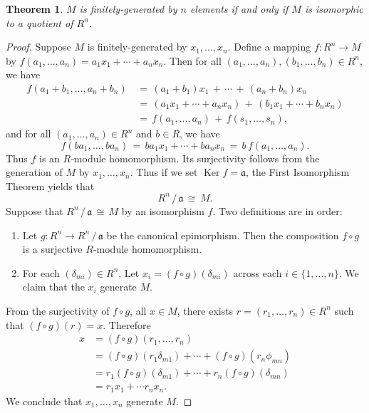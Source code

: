 \documentclass[11pt]{article}
\newtheorem{theorem}{Theorem}
\newcommand{\Ker}{\operatorname{Ker}}
\begin{document}
\begin{adjustwidth}{0.5cm}{}
	\begin{theorem}
		$M$ is finitely-generated by $n$ elements if and only if $M$ is isomorphic to a quotient of $R^{n}$.
	\end{theorem}
	\begin{proof}
    Suppose $M$ is finitely-generated by $x_{1}, \ldots, x_{n}$. Define a mapping $f : R^{n} \to M$ by $f(a_{1}, \ldots, a_{n}) = a_{1}x_{1} + \cdots + a_{n}x_{n}$. Then for all $(a_{1}, \ldots, a_{n}), (b_{1}, \ldots, b_{n}) \in R^{n}$, we have
		\begin{align*}
			f(a_{1} + b_{1}, \ldots, a_{n} + b_{n}) \, &= \, (a_{1} + b_{1}) x_{1} \, + \, \cdots \, + \, (a_{n} + b_{n})x_{n} \\
			&= \, (a_{1}x_{1} + \cdots + a_{n}x_{n}) \, + \, (b_{1}x_{1} + \cdots + b_{n}x_{n}) \\
			&= \, f(a_{1}, \ldots, a_{n}) \, + \, f(s_{1}, \ldots, s_{n}),
		\end{align*}
    and for all $(a_{1}, \ldots, a_{n}) \in R^{n}$ and $b \in R$, we have
		\[
			f(b a_{1}, \ldots, b a_{n}) \, = \, b a_{1} x_{1} + \cdots + b a_{n} x_{n} \, = \, b \, f(a_{1}, \ldots, a_{n}).
		\]
    Thus $f$ is an $R$-module homomorphism. Its surjectivity follows from the generation of $M$ by $x_{1}, \ldots, x_{n}$. Thus if we set $\Ker f = \mathfrak{a}$, the First Isomorphism Theorem yields that
		\[
			R^{n} \,/\, \mathfrak{a} \, \cong \, M.
		\]
		Suppose that $R^{n} \,/\, \mathfrak{a} \, \cong \, M$ by an isomorphism $f$. Two definitions are in order:
    \begin{enumerate}
      \item Let $g : R^{n} \to R^{n} \, / \, \mathfrak{a}$ be the canonical epimorphism. Then the composition $f \circ g$ is a surjective $R$-module homomorphism.
      \item For each $(\delta_{mi}) \in R^{n}$, Let $x_{i} = (f \circ g)(\delta_{mi})$ across each $i \in \{ 1, \ldots, n \}$. We claim that the $x_{i}$ generate $M$.
    \end{enumerate}
    From the surjectivity of $f \circ g$, all $x \in M$, there exists $r = (r_{1}, \ldots, r_{n}) \in R^{n}$ such that $(f \circ g)(r) = x$. Therefore 
		\begin{align*}
			x &= (f \circ g)(r_{1}, \ldots, r_{n}) \\
        &= (f \circ g)(r_{1} \delta_{m1}) + \cdots + (f \circ g)(r_{n} \phi_{mn}) \\
			  &= r_{1} (f \circ g)(\delta_{m1}) + \cdots + r_{n} (f \circ g)(\delta_{mn}) \\
			  &= r_{1} x_{1} + \cdots r_{n} x_{n}.
		\end{align*}
		We conclude that $x_{1}, \ldots, x_{n}$ generate $M$.
	\end{proof}
\end{adjustwidth}
\end{document}
